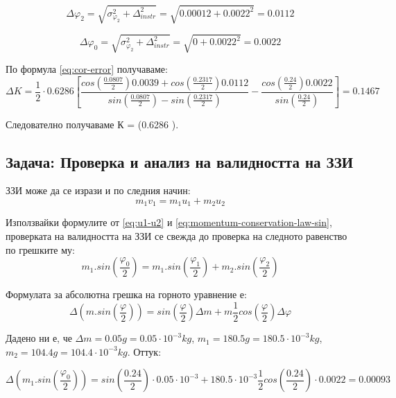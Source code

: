 \documentclass[12pt]{article}
\begin{document}
\begin{displaymath}
    \Delta\varphi_2 = \sqrt{\sigma_{\varphi_2}^2 + \Delta_{instr}^2} = \sqrt{0.00012 + 0.0022^2} = 0.0112
\end{displaymath}

\begin{displaymath}
    \Delta\varphi_0 = \sqrt{\sigma_{\varphi_2}^2 + \Delta_{instr}^2} = \sqrt{0 + 0.0022^2} = 0.0022
\end{displaymath}

По формула \ref{eq:cor-error} получаваме:
\begin{displaymath}
    \Delta K = \frac{1}{2}\cdot 0.6286
    \left[
        \frac{cos(\frac{0.0807}{2})0.0039 + cos(\frac{0.2317}{2})0.0112}{sin(\frac{0.0807}{2}) - sin(\frac{0.2317}{2})} -     
        \frac{cos(\frac{0.24}{2})0.0022}{sin(\frac{0.24}{2})}
    \right] = 0.1467
\end{displaymath}

Следователно получаваме К = (0.6286 ).

\subsection{Задача: Проверка и анализ на валидността на ЗЗИ}
ЗЗИ може да се изрази и по следния начин:
\begin{equation}\label{eq:momentum-conservation-law-sin}
    m_1v_1 = m_1u_1 + m_2u_2
\end{equation}

Използвайки формулите от \ref{eq:u1-u2} и \ref{eq:momentum-conservation-law-sin}, проверката на валидността на ЗЗИ се свежда до проверка на следното равенство по грешките му:
\begin{equation}\label{eq:m-sin-1}
    m_1.sin(\frac{\varphi_0}{2}) = m_1.sin(\frac{\varphi_1}{2}) + m_2.sin(\frac{\varphi_2}{2})
\end{equation}

Формулата за абсолютна грешка на горното уравнение е:
\begin{equation}
    \Delta (m.sin(\frac{\varphi}{2})) = sin(\frac{\varphi}{2})\Delta m + m\frac{1}{2}cos(\frac{\varphi}{2})\Delta \varphi
\end{equation}

Дадено ни е, че $\Delta m = 0.05 g = 0.05 \cdot 10^{-3} kg$, $m_1 = 180.5 g = 180.5 \cdot 10^{-3} kg$, $m_2 = 104.4 g = 104.4 \cdot 10^{-3} kg$. Оттук:

\begin{displaymath}
    \Delta (m_1.sin(\frac{\varphi_0}{2})) = 
    sin(\frac{0.24}{2})\cdot 0.05 \cdot 10^{-3} + 180.5 \cdot 10^{-3}\frac{1}{2}cos(\frac{0.24}{2})\cdot 0.0022 = 0.00093
\end{displaymath}
\end{document}
